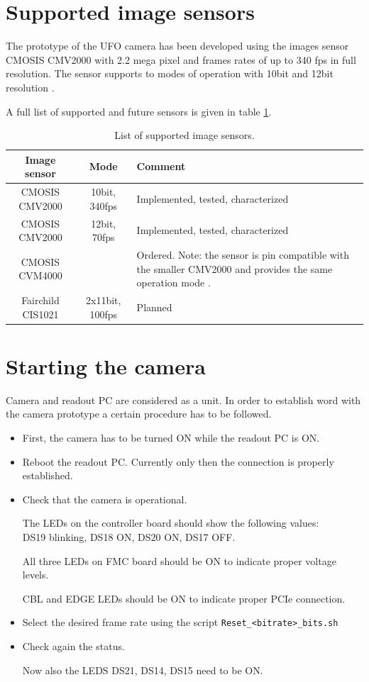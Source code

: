 \section{Supported image sensors}

The prototype of the UFO camera has been developed using the images sensor CMOSIS CMV2000 with 2.2 mega pixel and frames rates of up to 340 fps in full resolution. The sensor supports to modes of operation with 10bit and 12bit resolution \cite{CMOSIS:CMV2000}. 

A full list of supported and future sensors is given in table \ref{image-sensors}.



\begin{table}
\begin{center}
\begin{tabular}{|c|c|p{8cm}|}
\hline
Image sensor 			&  Mode 		& Comment \\
\hline
CMOSIS CMV2000 		& 10bit, 340fps & Implemented, tested, characterized \\
\hline
CMOSIS CMV2000		& 12bit, 70fps	& Implemented, tested, characterized \\
\hline
CMOSIS CVM4000		& 			& Ordered. Note: the sensor is pin compatible with the smaller CMV2000 and provides the same operation mode \cite{CMOSIS:CMV4000}. \\
\hline
Fairchild CIS1021		& 2x11bit, 100fps & Planned \cite{FAIRCHILD:CIS1021}\\
\hline
\end{tabular}
\end{center}
\caption{List of supported image sensors.}
\label{image-sensors}
\end{table}


\section{Starting the camera}
Camera and readout PC are considered as a unit. In order to establish word with the camera 
prototype a certain procedure has to be followed.

\begin{itemize}
\item First, the camera has to be turned ON while the readout PC is ON.
\item Reboot the readout PC. Currently only then the connection is properly established.
\item Check that the camera is operational. 

The LEDs on the controller board should show the following values:\\
DS19 blinking, DS18 ON, DS20  ON, DS17 OFF. 

All three LEDs on FMC board should be ON to indicate proper voltage levels.

CBL and EDGE LEDs should be ON to indicate proper PCIe connection. 
\item Select the desired frame rate using the script \verb/Reset_<bitrate>_bits.sh/
\item Check again the status. 

Now also the LEDS DS21, DS14, DS15 need to be ON.
\end{itemize}


